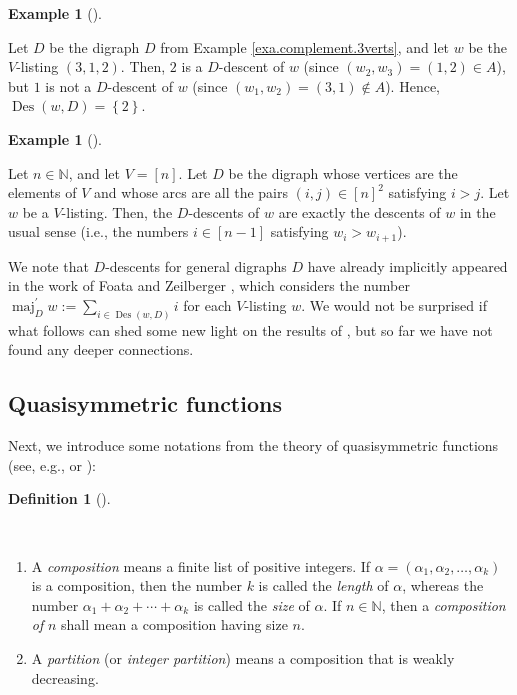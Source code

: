 \documentclass[numbers=enddot,12pt,final,onecolumn,notitlepage]{scrartcl}%
\numberwithin{exer}{section}
\theoremstyle{definition}
\newtheorem{defi}[theo]{Definition}
\newenvironment{definition}[1][]
{\begin{defi}[#1]\begin{leftbar}}
{\end{leftbar}\end{defi}}
\newtheorem{exam}[theo]{Example}
\newenvironment{example}[1][]
{\begin{exam}[#1]\begin{leftbar}}
{\end{leftbar}\end{exam}}
\let\sumnonlimits\sum
\renewcommand{\sum}{\sumnonlimits\limits}
\begin{document}
\begin{example}
Let $D$ be the digraph $D$ from Example \ref{exa.complement.3verts}, and let
$w$ be the $V$-listing $\left(  3,1,2\right)  $. Then, $2$ is a $D$-descent of
$w$ (since $\left(  w_{2},w_{3}\right)  =\left(  1,2\right)  \in A$), but $1$
is not a $D$-descent of $w$ (since $\left(  w_{1},w_{2}\right)  =\left(
3,1\right)  \notin A$). Hence, $\operatorname*{Des}\left(  w,D\right)
=\left\{  2\right\}  $.
\end{example}

\begin{example}
Let $n\in\mathbb{N}$, and let $V=\left[  n\right]  $. Let $D$ be the digraph
whose vertices are the elements of $V$ and whose arcs are all the pairs
$\left(  i,j\right)  \in\left[  n\right]  ^{2}$ satisfying $i>j$. Let $w$ be a
$V$-listing. Then, the $D$-descents of $w$ are exactly the descents of $w$ in
the usual sense (i.e., the numbers $i\in\left[  n-1\right]  $ satisfying
$w_{i}>w_{i+1}$).
\end{example}

We note that $D$-descents for general digraphs $D$ have already implicitly
appeared in the work of Foata and Zeilberger \cite{FoaZei96}, which considers
the number $\operatorname*{maj}\nolimits_{D}^{\prime}w:=\sum_{i\in
\operatorname*{Des}\left(  w,D\right)  }i$ for each $V$-listing $w$. We would
not be surprised if what follows can shed some new light on the results of
\cite{FoaZei96}, but so far we have not found any deeper connections.

\subsection{Quasisymmetric functions}

Next, we introduce some notations from the theory of quasisymmetric functions
(see, e.g., \cite[\S 7.19]{EC2} or \cite[Chapter 5]{GriRei}):

\begin{definition}
\ \ 

\begin{enumerate}
\item[\textbf{(a)}] A \emph{composition} means a finite list of positive
integers. If $\alpha=\left(  \alpha_{1},\alpha_{2},\ldots,\alpha_{k}\right)  $
is a composition, then the number $k$ is called the \emph{length} of $\alpha$,
whereas the number $\alpha_{1}+\alpha_{2}+\cdots+\alpha_{k}$ is called the
\emph{size} of $\alpha$. If $n\in\mathbb{N}$, then a \emph{composition of }$n$
shall mean a composition having size $n$.

\item[\textbf{(b)}] A \emph{partition} (or \emph{integer partition}) means a
composition that is weakly decreasing.
\end{enumerate}
\end{definition}
\end{document}

